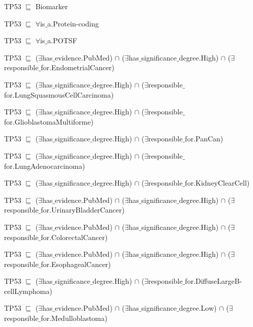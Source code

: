 \begin{itemize}[noitemsep]
\scriptsize{
    \item TP53 $ \sqsubseteq  $ Biomarker
    \item TP53 $ \sqsubseteq  $ $  \forall $is$ {\_}$a.Protein-coding
    \item TP53 $ \sqsubseteq  $ $  \forall $is$ {\_}$a.POTSF
    \item TP53 $ \sqsubseteq  $ ($\exists$has$ {\_}$evidence.PubMed) $ \cap $ ($\exists$has$ {\_}$significance$ {\_}$degree.High) $  \cap $ ($\exists$responsible$ {\_}$for.EndometrialCancer)
    \item TP53 $ \sqsubseteq  $ ($\exists$has$ {\_}$significance$ {\_}$degree.High) $  \cap $ ($\exists$responsible$ {\_}$for.LungSquasmousCellCarcinoma)
    \item TP53 $ \sqsubseteq  $ ($\exists$has$ {\_}$significance$ {\_}$degree.High) $  \cap $ ($\exists$responsible$ {\_}$for.GlioblastomaMultiforme)
    \item TP53 $ \sqsubseteq  $ ($\exists$has$ {\_}$significance$ {\_}$degree.High) $  \cap $ ($\exists$responsible$ {\_}$for.PanCan)
    \item TP53 $ \sqsubseteq  $ ($\exists$has$ {\_}$significance$ {\_}$degree.High) $  \cap $ ($\exists$responsible$ {\_}$for.LungAdenocarcinoma)
    \item TP53 $ \sqsubseteq  $ ($\exists$has$ {\_}$significance$ {\_}$degree.High) $  \cap $ ($\exists$responsible$ {\_}$for.KidneyClearCell)
    \item TP53 $ \sqsubseteq  $ ($\exists$has$ {\_}$evidence.PubMed) $  \cap $ ($\exists$has$ {\_}$significance$ {\_}$degree.High) $  \cap $ ($\exists$responsible$ {\_}$for.UrinaryBladderCancer)
    \item TP53 $ \sqsubseteq  $ ($\exists$has$ {\_}$evidence.PubMed) $  \cap $ ($\exists$has$ {\_}$significance$ {\_}$degree.High) $  \cap $ ($\exists$responsible$ {\_}$for.ColorectalCancer)
    \item TP53 $ \sqsubseteq  $ ($\exists$has$ {\_}$evidence.PubMed) $  \cap $ ($\exists$has$ {\_}$significance$ {\_}$degree.High) $  \cap $ ($\exists$responsible$ {\_}$for.EsophagealCancer)
    \item TP53 $ \sqsubseteq  $ ($\exists$has$ {\_}$significance$ {\_}$degree.High) $  \cap $ ($\exists$responsible$ {\_}$for.DiffuseLargeB-cellLymphoma)
    \item TP53 $ \sqsubseteq  $ ($\exists$has$ {\_}$evidence.PubMed) $  \cap $ ($\exists$has$ {\_}$significance$ {\_}$degree.Low) $  \cap $ ($\exists$responsible$ {\_}$for.Medulloblastoma)
}
\end{itemize}
